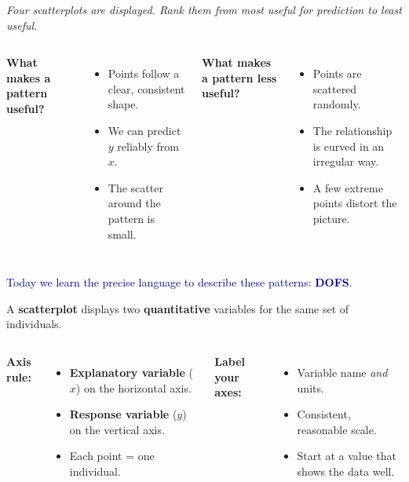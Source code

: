 \documentclass[aspectratio=169, 11pt]{beamer}
\begin{document}
\begin{frame}[t, plain]
  \vspace{0.3cm}
  \textit{Four scatterplots are displayed. Rank them from most useful for prediction to least useful.}
  \vspace{0.4cm}
  \begin{columns}
      \textbf{What makes a pattern useful?}
      \begin{itemize}
        \item Points follow a clear, consistent shape.
        \item We can predict $y$ reliably from $x$.
        \item The scatter around the pattern is small.
      \end{itemize}
      \textbf{What makes a pattern less useful?}
      \begin{itemize}
        \item Points are scattered randomly.
        \item The relationship is curved in an irregular way.
        \item A few extreme points distort the picture.
      \end{itemize}
  \end{columns}
  \vspace{0.5cm}
  \textcolor{navy}{\small Today we learn the precise language to describe these patterns: \textbf{DOFS}.}
\end{frame}

\begin{frame}[t, plain]
  \vspace{0.3cm}
  A \textbf{scatterplot} displays two \textbf{quantitative} variables for the same set of individuals.
  \vspace{0.4cm}
  \begin{columns}
      \textbf{Axis rule:}
      \begin{itemize}
        \item \textbf{Explanatory variable} ($x$) on the horizontal axis.
        \item \textbf{Response variable} ($y$) on the vertical axis.
        \item Each point = one individual.
      \end{itemize}
      \textbf{Label your axes:}
      \begin{itemize}
        \item Variable name \textit{and} units.
        \item Consistent, reasonable scale.
        \item Start at a value that shows the data well.
      \end{itemize}
  \end{columns}
\end{frame}
\end{document}
